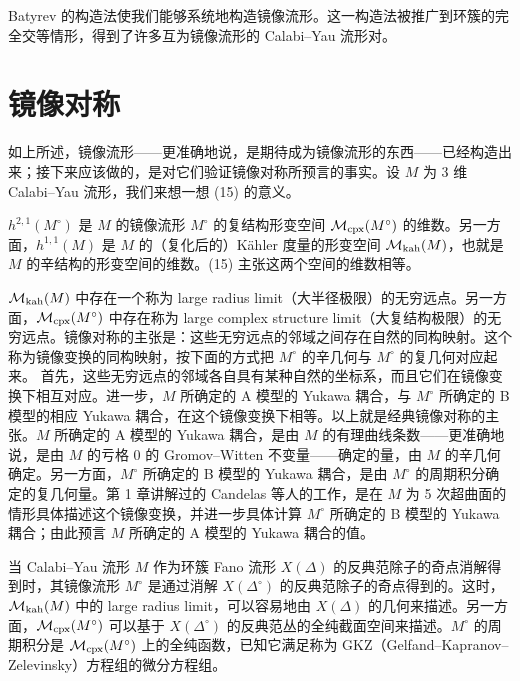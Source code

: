 Batyrev 的构造法使我们能够系统地构造镜像流形。这一构造法被推广到环簇的完全交等情形，得到了许多互为镜像流形的 Calabi--Yau 流形对。

\section{镜像对称}

如上所述，镜像流形——更准确地说，是期待成为镜像流形的东西——已经构造出来；接下来应该做的，是对它们验证镜像对称所预言的事实。设 $M$ 为 3 维 Calabi--Yau 流形，我们来想一想 (15) 的意义。

$h^{2,1}(M^\circ)$ 是 $M$ 的镜像流形 $M^\circ$ 的复结构形变空间 $\mathcal{M}_{\mathrm{cpx}}(M^\circ)$ 的维数。另一方面，$h^{1,1}(M)$ 是 $M$ 的（复化后的）Kähler 度量的形变空间 $\mathcal{M}_{\mathrm{kah}}(M)$，也就是 $M$ 的辛结构的形变空间的维数。(15) 主张这两个空间的维数相等。

$\mathcal{M}_{\mathrm{kah}}(M)$ 中存在一个称为 large radius limit（大半径极限）的无穷远点。另一方面，$\mathcal{M}_{\mathrm{cpx}}(M^\circ)$ 中存在称为 large complex structure limit（大复结构极限）的无穷远点。镜像对称的主张是：这些无穷远点的邻域之间存在自然的同构映射。这个称为镜像变换的同构映射，按下面的方式把 $M^\circ$ 的辛几何与 $M^\circ$ 的复几何对应起来。
首先，这些无穷远点的邻域各自具有某种自然的坐标系，而且它们在镜像变换下相互对应。进一步，$M$ 所确定的 A 模型的 Yukawa 耦合，与 $M^\circ$ 所确定的 B 模型的相应 Yukawa 耦合，在这个镜像变换下相等。以上就是经典镜像对称的主张。$M$ 所确定的 A 模型的 Yukawa 耦合，是由 $M$ 的有理曲线条数——更准确地说，是由 $M$ 的亏格 0 的 Gromov--Witten 不变量——确定的量，由 $M$ 的辛几何确定。另一方面，$M^\circ$ 所确定的 B 模型的 Yukawa 耦合，是由 $M^\circ$ 的周期积分确定的复几何量。第 1 章讲解过的 Candelas 等人的工作，是在 $M$ 为 5 次超曲面的情形具体描述这个镜像变换，并进一步具体计算 $M^\circ$ 所确定的 B 模型的 Yukawa 耦合；由此预言 $M$ 所确定的 A 模型的 Yukawa 耦合的值。

当 Calabi--Yau 流形 $M$ 作为环簇 Fano 流形 $X(\Delta)$ 的反典范除子的奇点消解得到时，其镜像流形 $M^\circ$ 是通过消解 $X(\Delta^\circ)$ 的反典范除子的奇点得到的。这时，$\mathcal{M}_{\mathrm{kah}}(M)$ 中的 large radius limit，可以容易地由 $X(\Delta)$ 的几何来描述。另一方面，$\mathcal{M}_{\mathrm{cpx}}(M^\circ)$ 可以基于 $X(\Delta^\circ)$ 的反典范丛的全纯截面空间来描述。$M^\circ$ 的周期积分是 $\mathcal{M}_{\mathrm{cpx}}(M^\circ)$ 上的全纯函数，已知它满足称为 GKZ（Gelfand--Kapranov--Zelevinsky）方程组的微分方程组。

